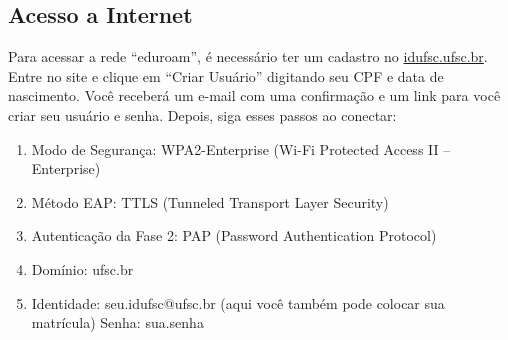 \subsection{Acesso a Internet} 
Para acessar a rede “eduroam”, é necessário ter um cadastro no \href{idufsc.ufsc.br}{idufsc.ufsc.br}. Entre no site e clique em “Criar Usuário” digitando seu CPF e data de nascimento. Você receberá um e-mail com uma confirmação e um link para você criar seu usuário e senha. Depois, siga esses passos ao conectar: 
\begin{enumerate}
\item Modo de Segurança: WPA2-Enterprise (Wi-Fi Protected Access II – Enterprise)

\item Método EAP: TTLS (Tunneled Transport Layer Security)

\item Autenticação da Fase 2: PAP (Password Authentication Protocol)

\item Domínio: ufsc.br

\item Identidade: seu.idufsc@ufsc.br (aqui você também pode colocar sua matrícula)
Senha: sua.senha
\end{enumerate}
